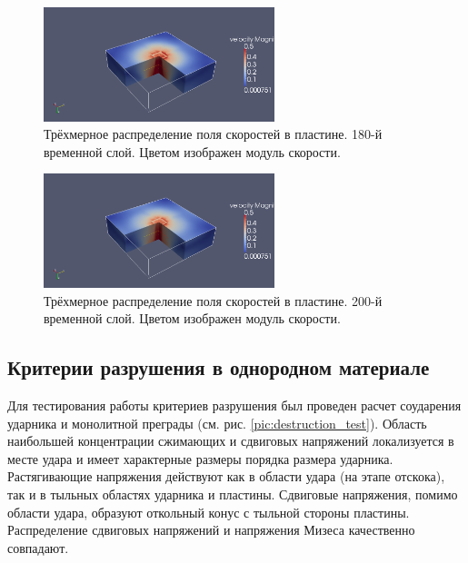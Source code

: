\begin{figure}[htp]
\centering
\includegraphics[width=0.6\textwidth]{png/strike-test/plate-3d-v/0180.png}
\caption{Трёхмерное распределение поля скоростей в пластине. 180-й временной слой. Цветом изображен модуль скорости.}
\end{figure}

\begin{figure}[htp]
\centering
\includegraphics[width=0.6\textwidth]{png/strike-test/plate-3d-v/0200.png}
\caption{Трёхмерное распределение поля скоростей в пластине. 200-й временной слой. Цветом изображен модуль скорости.}
\label{pic:striker_test_plate_200}
\end{figure}

\clearpage
\newpage

\subsection{Критерии разрушения в однородном материале}

Для тестирования работы критериев разрушения был проведен расчет соударения ударника и монолитной преграды (см. рис. \ref{pic:destruction_test}). Область наибольшей концентрации сжимающих и сдвиговых напряжений локализуется в месте удара и имеет характерные размеры порядка размера ударника. Растягивающие напряжения действуют как в области удара (на этапе отскока), так и в тыльных областях ударника и пластины. Сдвиговые напряжения, помимо области удара, образуют откольный конус с тыльной стороны пластины. Распределение сдвиговых напряжений и напряжения Мизеса качественно совпадают.

